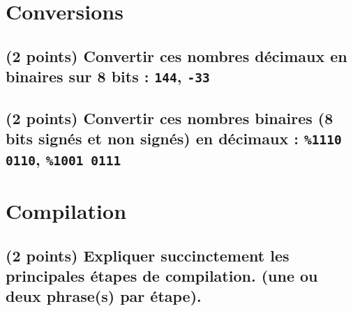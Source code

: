 \documentclass[11pt,a4paper]{article}
\author{Fabrice BOISSIER}
\begin{document}
\setlength{\fboxrule}{2pt}

\noindent {}



%


\section{Conversions} %

\subsection{(2 points) Convertir ces nombres décimaux en binaires sur 8 bits : \texttt{144}, \texttt{-33}}
\bigskip

\subsection{(2 points) Convertir ces nombres binaires (8 bits signés et non signés) en décimaux : \texttt{\%1110 0110}, \texttt{\%1001 0111}}
\bigskip
\bigskip
\bigskip

\section{Compilation} %

\subsection{(2 points) Expliquer succinctement les principales étapes de compilation. (une ou deux phrase(s) par étape).}

\bigskip
\bigskip
\bigskip

\end{document}
